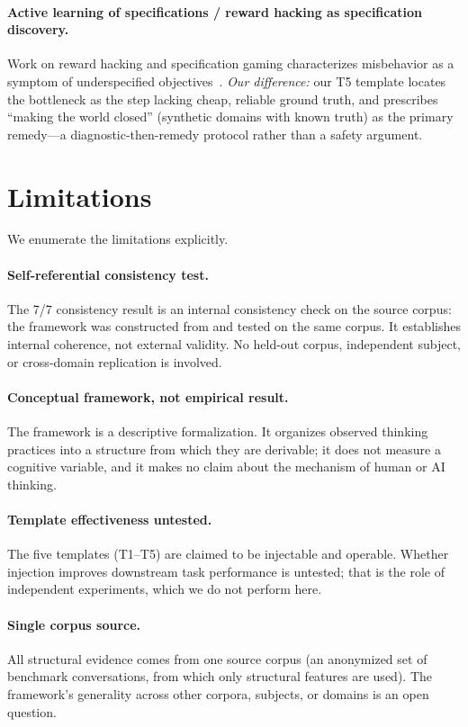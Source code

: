 \documentclass[11pt]{article}
\begin{document}
\paragraph{Active learning of specifications / reward hacking as specification discovery.}
Work on reward hacking and specification gaming characterizes misbehavior as a
symptom of underspecified objectives~\cite{skalse_reward_hacking_2022,gallego_spec_self_correction_2025}. \emph{Our
difference:} our T5 template locates the bottleneck as the step lacking cheap,
reliable ground truth, and prescribes ``making the world closed'' (synthetic
domains with known truth) as the primary remedy---a diagnostic-then-remedy
protocol rather than a safety argument.
\section{Limitations}
\label{sec:limitations}

We enumerate the limitations explicitly.

\paragraph{Self-referential consistency test.}
The 7/7 consistency result is an internal consistency check on the source
corpus: the framework was constructed from and tested on the same corpus. It
establishes internal coherence, not external validity. No held-out corpus,
independent subject, or cross-domain replication is involved.

\paragraph{Conceptual framework, not empirical result.}
The framework is a descriptive formalization. It organizes observed thinking
practices into a structure from which they are derivable; it does not measure a
cognitive variable, and it makes no claim about the mechanism of human or AI
thinking.

\paragraph{Template effectiveness untested.}
The five templates (T1--T5) are claimed to be injectable and operable. Whether
injection improves downstream task performance is untested; that is the role of
independent experiments, which we do not perform here.

\paragraph{Single corpus source.}
All structural evidence comes from one source corpus (an anonymized set of
benchmark conversations, from which only structural features are used). The
framework's generality across other corpora, subjects, or domains is an open
question.
\end{document}
